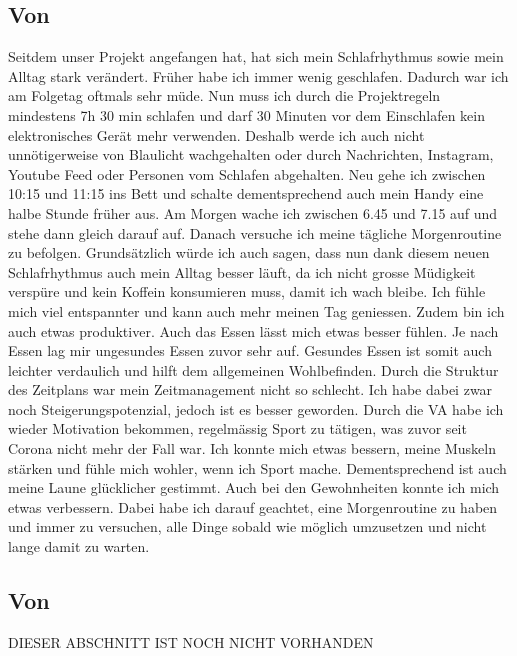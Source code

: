 \subsection{Von \bastian}
\authortoc{\bastian}{\subsectionident}
Seitdem unser Projekt angefangen hat, hat sich mein Schlafrhythmus sowie mein Alltag stark verändert. Früher habe ich immer wenig geschlafen. Dadurch war ich am Folgetag oftmals sehr müde. Nun muss ich durch die Projektregeln mindestens 7h 30 min schlafen und darf 30 Minuten vor dem Einschlafen kein elektronisches Gerät mehr verwenden. Deshalb werde ich auch nicht unnötigerweise von Blaulicht wachgehalten oder durch Nachrichten, Instagram, Youtube Feed oder Personen vom Schlafen abgehalten. Neu gehe ich zwischen 10:15 und 11:15 ins Bett und schalte dementsprechend auch mein Handy eine halbe Stunde früher aus. Am Morgen wache ich zwischen 6.45 und 7.15 auf und stehe dann gleich darauf auf. Danach versuche ich meine tägliche Morgenroutine zu befolgen. Grundsätzlich würde ich auch sagen, dass nun dank diesem neuen Schlafrhythmus auch mein Alltag besser läuft, da ich nicht grosse Müdigkeit verspüre und kein Koffein konsumieren muss, damit ich wach bleibe. Ich fühle mich viel entspannter und kann auch mehr meinen Tag geniessen. Zudem bin ich auch etwas produktiver. Auch das Essen lässt mich etwas besser fühlen. Je nach Essen lag mir ungesundes Essen zuvor sehr auf. Gesundes Essen ist somit auch leichter verdaulich und hilft dem allgemeinen Wohlbefinden. Durch die Struktur des Zeitplans war mein Zeitmanagement nicht so schlecht. Ich habe dabei zwar noch Steigerungspotenzial, jedoch ist es besser geworden. Durch die VA habe ich wieder Motivation bekommen, regelmässig Sport zu tätigen, was zuvor seit Corona nicht mehr der Fall war. Ich konnte mich etwas bessern, meine Muskeln stärken und fühle mich wohler, wenn ich Sport mache. Dementsprechend ist auch meine Laune glücklicher gestimmt. Auch bei den Gewohnheiten konnte ich mich etwas verbessern. Dabei habe ich darauf geachtet, eine Morgenroutine zu haben und immer zu versuchen, alle Dinge sobald wie möglich umzusetzen und nicht lange damit zu warten.
\subsection{Von \dario}
\authortoc{\dario}{\subsectionident}
DIESER ABSCHNITT IST NOCH NICHT VORHANDEN
\newline
\newline
\lipsum[4-8][32-64]
